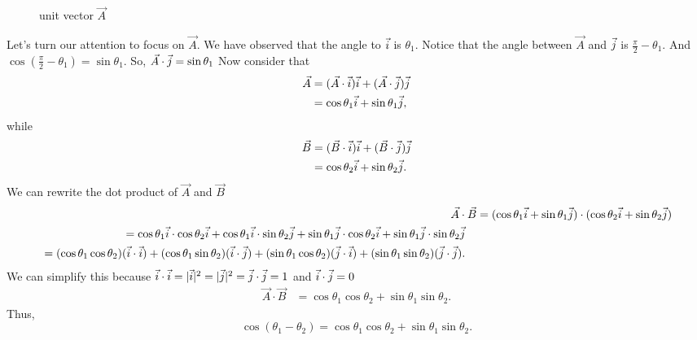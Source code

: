 \documentclass[main.tex]{subfiles}
\begin{document}
{\begin{figure}[h!]
    \caption{unit vector $\vec{A}$}

\end{figure}

Let's turn our attention to focus on $\vec{A}$. We have observed that the angle
to $\vec{i}$ is $\theta_1$. 
Notice that the angle between $\vec{A}$ and $\vec{j}$ is $\frac{\pi}{2} - \theta_1$.
And $\cos{(\frac{\pi}{2} - \theta_1)} = \sin{\theta_1}$.
So, $\vec{A}\cdot\vec{j} = \sin{\theta_1}$
Now consider that 
\begin{align*}
\vec{A} &= (\vec{A}\cdot\vec{i})\vec{i} + (\vec{A}\cdot\vec{j})\vec{j}\\
&= \cos{\theta_1}\vec{i} + \sin{\theta_1}\vec{j},
\end{align*}
while
\begin{align*}
\vec{B} &= (\vec{B}\cdot\vec{i})\vec{i} + (\vec{B}\cdot\vec{j})\vec{j}\\
&= \cos{\theta_2}\vec{i} + \sin{\theta_2}\vec{j}.
\end{align*}
We can rewrite the dot product of $\vec{A}$ and $\vec{B}$
\begin{align*}
\vec{A}\cdot\vec{B} &= (\cos{\theta_1}\vec{i} + \sin{\theta_1}\vec{j}) \cdot
(\cos{\theta_2}\vec{i} + \sin{\theta_2}\vec{j})\\
\begin{split}
&= 
\cos{\theta_1}\vec{i} \cdot\cos{\theta_2}\vec{i} 
+ \cos{\theta_1}\vec{i} \cdot\sin{\theta_2}\vec{j}
+\sin{\theta_1}\vec{j}\cdot\cos{\theta_2}\vec{i} 
+ \sin{\theta_1}\vec{j}\cdot\sin{\theta_2}\vec{j}
\end{split}\\
\begin{split}
&= 
(\cos{\theta_1}\cos{\theta_2})(\vec{i} \cdot\vec{i})
+ (\cos{\theta_1}\sin{\theta_2})(\vec{i} \cdot\vec{j})
+ (\sin{\theta_1}\cos{\theta_2})(\vec{j}\cdot\vec{i})
+ (\sin{\theta_1}\sin{\theta_2})(\vec{j}\cdot\vec{j}).
\end{split}
\end{align*}
We can simplify this because $\vec{i}\cdot\vec{i} = |\vec{i}|^2 = |\vec{j}|^2 =\vec{j}\cdot\vec{j} = 1$ 
and $\vec{i}\cdot\vec{j} = 0$
\begin{align*}
\vec{A}\cdot\vec{B} &=  
\cos{\theta_1}\cos{\theta_2}
+ \sin{\theta_1}\sin{\theta_2}.
\end{align*}
Thus,\[
\cos{(\theta_1 - \theta_2)} = 
\cos{\theta_1}\cos{\theta_2}
+ \sin{\theta_1}\sin{\theta_2}.
\]

}
\end{document}
